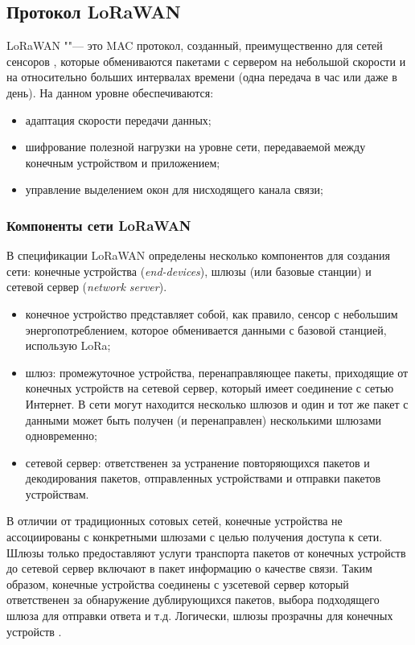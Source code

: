 \subsection{Протокол LoRaWAN}

LoRaWAN ""--- это MAC протокол, созданный, преимущественно для сетей сенсоров \cite{augustin2016, lavric2017internet}, которые обмениваются пакетами с сервером на небольшой скорости и на относительно больших интервалах времени (одна передача в час или даже в день).
На данном уровне обеспечиваются:
\begin{itemize}
 \item адаптация скорости передачи данных;
 \item шифрование полезной нагрузки на уровне сети, передаваемой между конечным устройством и приложением;
 \item управление выделением окон для нисходящего канала связи;
\end{itemize}


\subsubsection{Компоненты сети LoRaWAN}

В спецификации LoRaWAN определены несколько компонентов для создания сети: конечные устройства (\textit{end-devices}), шлюзы (или базовые станции) и сетевой сервер (\textit{network server}).
\begin{itemize}
 \item конечное устройство представляет собой, как правило, сенсор с небольшим энергопотреблением, которое обменивается данными с базовой станцией, использую LoRa;
 \item шлюз: промежуточное устройства, перенаправляющее пакеты, приходящие от конечных устройств на сетевой сервер, который имеет соединение с сетью Интернет. В сети могут находится несколько шлюзов и один и тот же пакет с данными может быть получен (и перенаправлен) несколькими шлюзами одновременно;
 \item сетевой сервер: ответственен за устранение повторяющихся пакетов и декодирования пакетов, отправленных устройствами и отправки пакетов устройствам.
\end{itemize}

В отличии от традиционных сотовых сетей, конечные устройства не ассоциированы с конкретными шлюзами с целью получения доступа к сети.
Шлюзы только предоставляют услуги транспорта пакетов от конечных устройств до сетевой сервер включают в пакет информацию о качестве связи. 
Таким образом, конечные устройства соединены с узсетевой сервер который ответственен за обнаружение дублирующихся пакетов, выбора подходящего шлюза для отправки ответа и т.д.
Логически, шлюзы прозрачны для конечных устройств \cite{augustin2016}.

